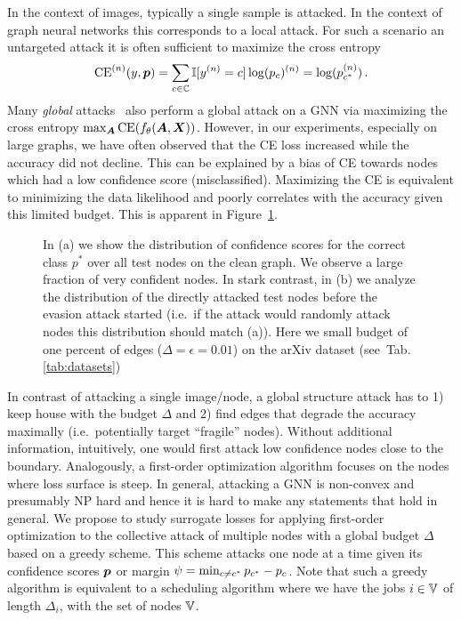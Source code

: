 \documentclass[sigconf,authordraft]{acmart}
\newcommand{\adj}{\mA}
\newcommand{\features}{\mX}
\begin{document}
In the context of images, typically a single sample is attacked. In the context of graph neural networks this corresponds to a local attack. For such a scenario an untargeted attack it is often sufficient to maximize the cross entropy 
\begin{equation}\label{eq:crossentropy}
\text{CE}^{(n)}(y, {\bm{p}}) = \sum_{c \in {\mathbb{C}}} \mathbb{I}[y^{(n)} = c] \log({p}_{c})^{(n)} = \log({p}_{c^*}^{(n)})\,.
\end{equation}
Many \emph{global} attacks~\citep{Chen2018, Wu2019, Xu2018, Zugner2019a} also perform a global attack on a GNN via maximizing the cross entropy \(\max_{\adj} \text{CE}(f_{\theta}(\adj, \features))\). However, in our experiments, especially on large graphs, we have often observed that the CE loss increased while the accuracy did not decline. This can be explained by a bias of CE towards nodes which had a low confidence score (misclassified). Maximizing the CE is equivalent to minimizing the data likelihood and poorly correlates with the accuracy given this limited budget. This is apparent in Figure~\ref{fig:negceprob}.

\begin{figure}[t]
  \centering
  \caption{In (a) we show the distribution of confidence scores for the correct class \(p^*\) over all test nodes on the clean graph. We observe a large fraction of very confident nodes. In stark contrast, in (b) we analyze the distribution of the directly attacked test nodes before the evasion attack started (i.e.\ if the attack would randomly attack nodes this distribution should match (a)). Here we small budget of one percent of edges (\(\Delta=\epsilon=0.01\)) on the arXiv dataset (see~Tab.\ref{tab:datasets})\label{fig:negceprob}}
\end{figure}

In contrast of attacking a single image/node, a global structure attack has to 1) keep house with the budget \(\Delta\) and 2) find edges that degrade the accuracy maximally (i.e.\ potentially target ``fragile'' nodes). Without additional information, intuitively, one would first attack low confidence nodes close to the boundary. Analogously, a first-order optimization algorithm focuses on the nodes where loss surface is steep. In general, attacking a GNN is non-convex and presumably NP hard and hence it is hard to make any statements that hold in general. We propose to study surrogate losses for applying first-order optimization to the collective attack of multiple nodes with a global budget \(\Delta\) based on a greedy scheme. This scheme attacks one node at a time given its confidence scores \({\bm{p}}\) or margin \(\psi = \min_{c \ne c^*} {p}_{c^*} - {p}_{c}\). Note that such a greedy algorithm is equivalent to a scheduling algorithm where we have the jobs \(i \in {\mathbb{V}}\) of length \(\Delta_i\), with the set of nodes \({\mathbb{V}}\).
\end{document}
